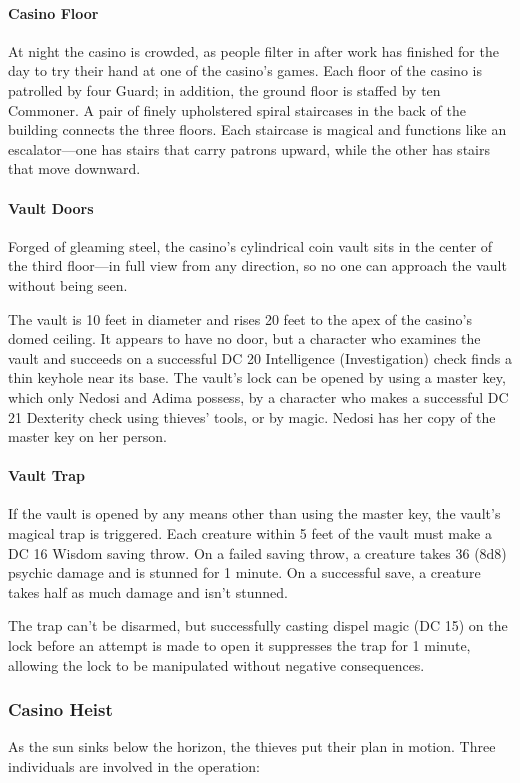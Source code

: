 \documentclass[10pt,a4paper,twoside,bg=print,twocolumn,openany,nodeprecatedcode]{dndbook}
\begin{document}
\paragraph{Casino Floor}
At night the casino is crowded, as people filter in after work has finished for the day to try their hand at one of the casino's games. Each floor of the casino is patrolled by four Guard; in addition, the ground floor is staffed by ten Commoner. A pair of finely upholstered spiral staircases in the back of the building connects the three floors. Each staircase is magical and functions like an escalator—one has stairs that carry patrons upward, while the other has stairs that move downward.

\paragraph{Vault Doors}
Forged of gleaming steel, the casino's cylindrical coin vault sits in the center of the third floor—in full view from any direction, so no one can approach the vault without being seen.

The vault is 10 feet in diameter and rises 20 feet to the apex of the casino's domed ceiling. It appears to have no door, but a character who examines the vault and succeeds on a successful DC 20 Intelligence (Investigation) check finds a thin keyhole near its base. The vault's lock can be opened by using a master key, which only Nedosi and Adima possess, by a character who makes a successful DC 21 Dexterity check using thieves' tools, or by magic. Nedosi has her copy of the master key on her person.

\paragraph{Vault Trap}
If the vault is opened by any means other than using the master key, the vault's magical trap is triggered. Each creature within 5 feet of the vault must make a DC 16 Wisdom saving throw. On a failed saving throw, a creature takes 36 (8d8) psychic damage and is stunned for 1 minute. On a successful save, a creature takes half as much damage and isn't stunned.

The trap can't be disarmed, but successfully casting dispel magic (DC 15) on the lock before an attempt is made to open it suppresses the trap for 1 minute, allowing the lock to be manipulated without negative consequences.

\subsubsection{Casino Heist}
As the sun sinks below the horizon, the thieves put their plan in motion. Three individuals are involved in the operation:
\end{document}
